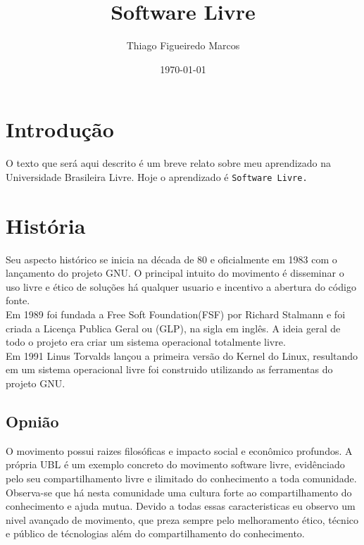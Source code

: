 \documentclass[12pt, onecolumn]{article}
\title{Software Livre}
\author{Thiago Figueiredo Marcos}
\date{\today}
\begin{document}
    \maketitle

    \tableofcontents

    \section*{Introdução}
        \hspace{2cm} O texto que será aqui descrito é um breve relato sobre meu aprendizado na Universidade Brasileira Livre.
            Hoje o aprendizado é {\tt Software Livre.}

    \section{História}
        \hspace{2cm}    Seu aspecto histórico se inicia na década de 80 e oficialmente em 1983 com o lançamento do projeto GNU.
            O principal intuito do movimento é disseminar o uso livre e ético de soluções 
            há qualquer usuario e incentivo a abertura do código fonte.\\ 

        \hspace{2cm}    Em 1989 foi fundada a Free Soft Foundation(FSF) por Richard Stalmann e foi criada a Licença Publica Geral ou (GLP),
            na sigla em inglês. A ideia geral de todo o projeto era criar um sistema operacional totalmente livre.\\

        \hspace{2cm}     Em 1991 Linus Torvalds lançou a primeira versão do Kernel do Linux, resultando em um sistema operacional livre
            foi construido utilizando as ferramentas do projeto GNU.

        \subsection{Opnião}
            \hspace{2cm}    O movimento possui raizes filosóficas e impacto social e econômico profundos. 
                A própria UBL é um exemplo concreto do movimento software livre, evidênciado pelo seu compartilhamento livre e ilimitado 
                do conhecimento a toda comunidade. \\ 
            \hspace{2cm} Observa-se que há nesta comunidade uma cultura forte ao compartilhamento do conhecimento e ajuda mutua.
                Devido a todas essas caracteristicas eu observo um nivel avançado de movimento, que  preza sempre pelo melhoramento 
                ético, técnico e público de técnologias além do compartilhamento do conhecimento.
        
\end{document}
